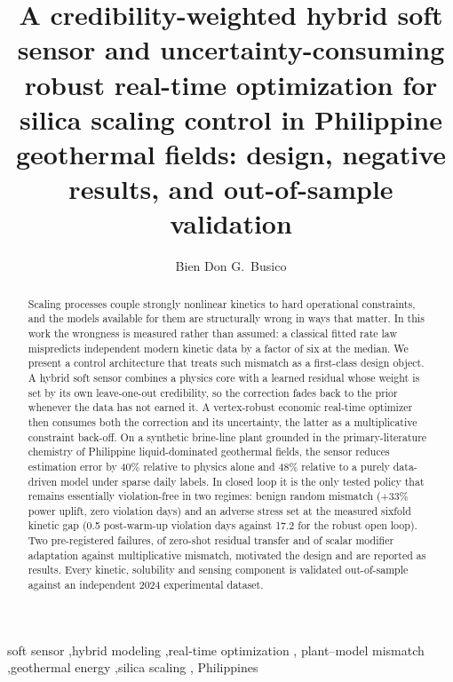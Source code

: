 \documentclass[review,number,sort&compress]{elsarticle}
\begin{document}
\begin{frontmatter}

\title{A credibility-weighted hybrid soft sensor and uncertainty-consuming
robust real-time optimization for silica scaling control in Philippine
geothermal fields: design, negative results, and out-of-sample
validation}

\author[mmcm]{Bien Don G.~Busico}

\begin{abstract}
Scaling processes couple strongly nonlinear kinetics to hard operational
constraints, and the models available for them are structurally wrong in
ways that matter. In this work the wrongness is measured rather than
assumed: a classical fitted rate law mispredicts independent modern
kinetic data by a factor of six at the median. We present a control
architecture that treats such mismatch as a first-class design object.
A hybrid soft sensor combines a physics core with a learned residual
whose weight is set by its own leave-one-out credibility, so the
correction fades back to the prior whenever the data has not earned it.
A vertex-robust economic real-time optimizer then consumes both the
correction and its uncertainty, the latter as a multiplicative
constraint back-off. On a synthetic brine-line plant grounded in the
primary-literature chemistry of Philippine liquid-dominated geothermal
fields, the sensor reduces estimation error by 40\% relative to physics
alone and 48\% relative to a purely data-driven model under sparse
daily labels. In closed loop it is the only tested policy that remains
essentially violation-free in two regimes: benign random mismatch
(+33\% power uplift, zero violation days) and an adverse stress set at
the measured sixfold kinetic gap (0.5 post-warm-up violation days
against 17.2 for the robust open loop). Two pre-registered failures,
of zero-shot residual transfer and of scalar modifier adaptation
against multiplicative mismatch, motivated the design and are reported
as results. Every kinetic, solubility and sensing component is
validated out-of-sample against an independent 2024 experimental
dataset.

\end{abstract}

\begin{keyword}
soft sensor \sep hybrid modeling \sep real-time optimization \sep
plant--model mismatch \sep geothermal energy \sep silica scaling \sep
Philippines
\end{keyword}

\end{frontmatter}
\end{document}
